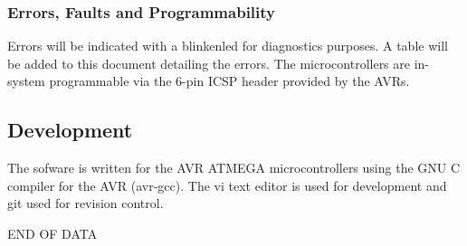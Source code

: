 \documentclass[dvips,12pt]{article}
\begin{document}

\subsubsection{Errors, Faults and Programmability}
Errors will be indicated with a blinkenled for diagnostics purposes. A
table will be added to this document detailing the errors. The
microcontrollers are in-system programmable via the 6-pin ICSP header
provided by the AVRs. 
\subsection{Development}
The sofware is written for the AVR ATMEGA microcontrollers using the GNU C
compiler for the AVR (avr-gcc). The vi text editor is used for development and git used for revision control. 


\centering
\vspace{2cm}
END OF DATA
\appendix
\end{document}
